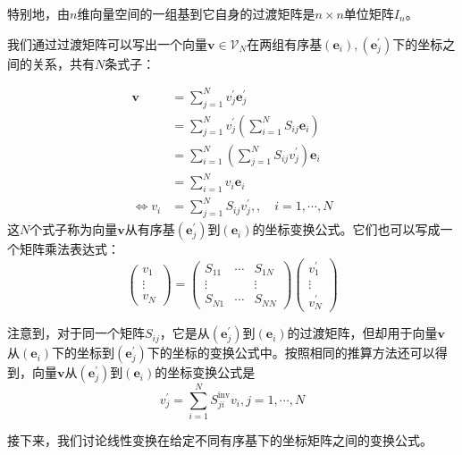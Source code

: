 \documentclass[main.tex]{subfiles}
\begin{document}
特别地，由$n$维向量空间的一组基到它自身的过渡矩阵是$n\times n$单位矩阵$I_n$。

我们通过过渡矩阵可以写出一个向量$\mathbf{v}\in\mathcal{V}_N$在两组有序基$\left(\mathbf{e}_i\right),\left(\mathbf{e}^\prime_j\right)$下的坐标之间的关系，共有$N$条式子：

\begin{align*}
    \mathbf{v}          & =\sum_{j=1}^Nv^\prime_j\mathbf{e}^\prime_j                          \\
                        & =\sum_{j=1}^Nv^\prime_j\left(\sum_{i=1}^NS_{ij}\mathbf{e}_i\right)  \\
                        & =\sum_{i=1}^N\left(\sum_{j=1}^N S_{ij}v^\prime_j\right)\mathbf{e}_i \\
                        & =\sum_{i=1}^Nv_i\mathbf{e}_i                                        \\
    \Leftrightarrow v_i & =\sum_{j=1}^NS_{ij}v^\prime_j,,\quad i=1,\cdots,N
\end{align*}
这$N$个式子称为向量$\mathbf{v}$从有序基$\left(\mathbf{e}^\prime_j\right)$到$\left(\mathbf{e}_i\right)$的坐标变换公式。它们也可以写成一个矩阵乘法表达式：
\[\left(\begin{array}{c}v_1\\\vdots\\v_N\end{array}\right)=\left(\begin{array}{ccc}S_{11}&\cdots&S_{1N}\\\vdots&&\vdots\\S_{N1}&\cdots&S_{NN}\end{array}\right)\left(\begin{array}{c}v^\prime_1\\\vdots\\v^\prime_N\end{array}\right)\]

注意到，对于同一个矩阵$S_{ij}$，它是从$\left(\mathbf{e}^\prime_j\right)$到$\left(\mathbf{e}_i\right)$的过渡矩阵，但却用于向量$\mathbf{v}$从$\left(\mathbf{e}_i\right)$下的坐标到$\left(\mathbf{e}^\prime_j\right)$下的坐标的变换公式中。按照相同的推算方法还可以得到，向量$\mathbf{v}$从$\left(\mathbf{e}^\prime_j\right)$到$\left(\mathbf{e}_i\right)$的坐标变换公式是\[v^\prime_j=\sum_{i=1}^NS^\mathrm{inv}_{ji}v_i,j=1,\cdots,N\]

接下来，我们讨论线性变换在给定不同有序基下的坐标矩阵之间的变换公式。
\end{document}
